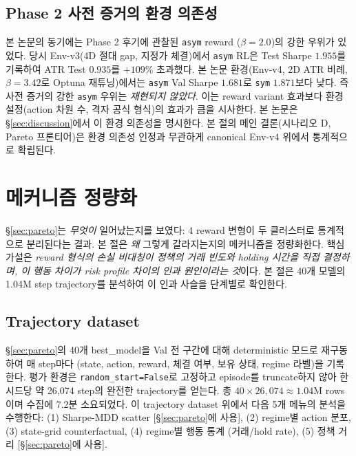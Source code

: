 \documentclass[11pt, a4paper]{article}
\begin{document}
\subsection{Phase 2 사전 증거의 환경 의존성}
\label{sec:pareto_env_dependence}

본 논문의 동기에는 Phase 2 후기에 관찰된 \texttt{asym} reward
($\beta=2.0$)의 강한 우위가 있었다. 당시 Env-v3(4D 절대 gap, 지정가 체결)에서
\texttt{asym} RL은 Test Sharpe $1.955$를 기록하여 ATR Test $0.935$를 $+109\%$
초과했다. 본 논문 환경(Env-v4, 2D ATR 비례, $\beta=3.42$로 Optuna 재튜닝)에서는
\texttt{asym} Val Sharpe $1.681$로 \texttt{sym} $1.871$보다 낮다. 즉 사전 증거의
강한 \texttt{asym} 우위는 \emph{재현되지 않았다}. 이는 reward variant 효과보다
환경 설정(action 차원 수, 격자 공식 형식)의 효과가 큼을 시사한다. 본 논문은
\S\ref{sec:discussion}에서 이 환경 의존성을 명시한다. 본 절의 메인
결론(시나리오 D, Pareto 프론티어)은 환경 의존성 인정과 무관하게 canonical
Env-v4 위에서 통계적으로 확립된다.

\section{메커니즘 정량화}
\label{sec:mechanism}

\S\ref{sec:pareto}는 \emph{무엇이} 일어났는지를 보였다: 4 reward 변형이 두 클러스터로
통계적으로 분리된다는 결과. 본 절은 \emph{왜} 그렇게 갈라지는지의 메커니즘을
정량화한다. 핵심 가설은
\textit{reward 형식의 손실 비대칭이 정책의 거래 빈도와 holding 시간을 직접 결정하며,
이 행동 차이가 risk profile 차이의 인과 원인이라는 것}이다. 본 절은 40개 모델의
1.04M step trajectory를 분석하여 이 인과 사슬을 단계별로 확인한다.

\subsection{Trajectory dataset}
\label{sec:mechanism_dataset}

\S\ref{sec:pareto}의 40개 best\_model을 Val 전 구간에 대해 deterministic 모드로
재구동하여 매 step마다 (state, action, reward, 체결 여부, 보유 상태, regime 라벨)을
기록한다. 평가 환경은 \texttt{random\_start=False}로 고정하고 episode를
truncate하지 않아 한 시드당 약 26{,}074 step의 완전한 trajectory를 얻는다. 총
$40 \times 26{,}074 \approx 1.04\text{M}$ rows이며 수집에 7.2분 소요되었다. 이
trajectory dataset 위에서 다음 5개 메뉴의 분석을 수행한다: (1) Sharpe-MDD scatter
[\S\ref{sec:pareto}에 사용], (2) regime별 action 분포, (3) state-grid
counterfactual, (4) regime별 행동 통계 (거래/hold rate), (5) 정책 거리
[\S\ref{sec:pareto}에 사용].
\end{document}
